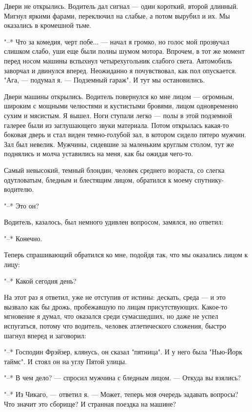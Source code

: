 Двери не  открылись.  Водитель  дал  сигнал  ---  один  короткий,  второй
длинный. Мигнул яркими фарами, переключил на слабые, а потом вырубил и их.
Мы оказались в кромешной тьме.

"--* Что за комедия, черт побе... --- начал я громко, но голос мой прозвучал
слишком слабо, уши еще были полны шумом мотора. Впрочем, в тот  же  момент
перед носом машины  вспыхнул  четырехугольник  слабого  света.  Автомобиль
заворчал и двинулся вперед. Неожиданно я почувствовал, как пол опускается.
"Ага, --- подумал я. --- Подземный гараж". И тут мы остановились.

Двери машины открылись. Водитель повернулся ко мне  лицом  ---  огромным,
широким с мощными челюстями и кустистыми бровями, лицом одновременно сухим
и мясистым. Я вышел. Ноги ступали легко --- полы в  этой  подземной  галерее
были из заглушающего звуки материала.  Потом  открылась  какая-то  боковая
дверь и стал виден темно-голубой зал, в котором сидело пятеро мужчин.  Зал
был невелик.  Мужчины,  сидевшие  за  маленьким  круглым  столом,  тут  же
поднялись и молча уставились на меня, как бы ожидая чего-то.

Самый невысокий, темный блондин, человек среднего возраста,  со  слегка
одутловатым,   бледным   и   блестящим   лицом,    обратился    к    моему
спутнику-водителю.

"--* Это он?

Водитель, казалось, был немного удивлен вопросом, замялся, но ответил:

"--* Конечно.

Теперь спрашивающий обратился ко мне, подойдя  так,  что  мы  оказались
лицом к лицу:

"--* Какой сегодня день?

На этот раз я ответил, уже не отступив от истины: дескать,  среда  ---  и
это вызвало как бы дрожь, пробежавшую по  лицам  присутствующих.  Какое-то
мгновение я думал, что  оказался  среди  сумасшедших,  но  даже  не  успел
испугаться, потому что водитель, человек  атлетического  сложения,  быстро
шагнул вперед и заговорил:

"--* Господин Фрэйзер,  клянусь,  он  сказал  "пятница".  И  у  него  была
"Нью-Йорк таймс". И стоял он на углу Пятой улицы.

"--* В чем дело? --- спросил мужчина с бледным лицом. --- Откуда вы взялись?

"--* Из Чикаго, --- ответил я. --- Может, теперь моя очередь задавать вопросы?
Что значит это сборище? И странная поездка на машине?

